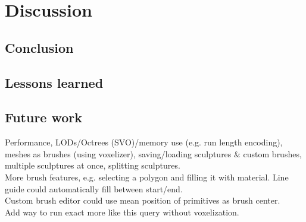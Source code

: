 \chapter{Discussion}

\section{Conclusion}

\section{Lessons learned}

\section{Future work}
Performance, LODs/Octrees (SVO)/memory use (e.g. run length encoding), meshes as brushes (using voxelizer), saving/loading sculptures \& custom brushes, multiple sculptures at once, splitting sculptures.\\
More brush features, e.g. selecting a polygon and filling it with material. Line guide could automatically fill between start/end.\\
Custom brush editor could use mean position of primitives as brush center.\\
Add way to run exact more like this query without voxelization.